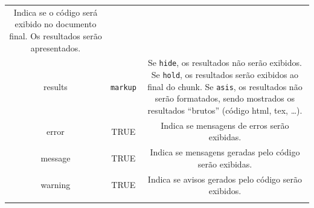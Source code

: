 \documentclass[]{book}
\begin{document}
\begin{longtable}[]{@{}ccc@{}}
\begin{minipage}[t]{0.55\columnwidth}
Indica se o código será exibido no documento final. Os resultados serão
apresentados.\strut
\end{minipage}\tabularnewline
\begin{minipage}[t]{0.15\columnwidth}\centering\strut
results\strut
\end{minipage} & \begin{minipage}[t]{0.21\columnwidth}\centering\strut
\texttt{markup}\strut
\end{minipage} & \begin{minipage}[t]{0.55\columnwidth}\centering\strut
Se \texttt{hide}, os resultados não serão exibidos. Se \texttt{hold}, os
resultados serão exibidos ao final do chunk. Se \texttt{asis}, os
resultados não serão formatados, sendo mostrados os resultados
``brutos'' (código html, tex, \ldots{}).\strut
\end{minipage}\tabularnewline
\begin{minipage}[t]{0.15\columnwidth}\centering\strut
error\strut
\end{minipage} & \begin{minipage}[t]{0.21\columnwidth}\centering\strut
TRUE\strut
\end{minipage} & \begin{minipage}[t]{0.55\columnwidth}\centering\strut
Indica se mensagens de erros serão exibidas.\strut
\end{minipage}\tabularnewline
\begin{minipage}[t]{0.15\columnwidth}\centering\strut
message\strut
\end{minipage} & \begin{minipage}[t]{0.21\columnwidth}\centering\strut
TRUE\strut
\end{minipage} & \begin{minipage}[t]{0.55\columnwidth}\centering\strut
Indica se mensagens geradas pelo código serão exibidas.\strut
\end{minipage}\tabularnewline
\begin{minipage}[t]{0.15\columnwidth}\centering\strut
warning\strut
\end{minipage} & \begin{minipage}[t]{0.21\columnwidth}\centering\strut
TRUE\strut
\end{minipage} & \begin{minipage}[t]{0.55\columnwidth}\centering\strut
Indica se avisos gerados pelo código serão exibidos.\strut
\end{minipage}\tabularnewline
\begin{minipage}[t]{0.15\columnwidth}\centering\strut

\end{minipage}
\end{longtable}
\end{document}
